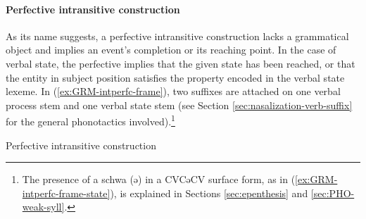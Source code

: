\begin{exe}
\begin{exe}
\begin{exe}
\begin{exe}
\begin{exe}
\begin{exe}
\begin{exe}
\begin{exe}
\begin{exe}
\begin{exe}
\begin{exe}
 
%  
% 
% 
% 
% 
% 

\paragraph{Perfective intransitive construction}
\label{sec:GRM-verb-perf-intran}

As its name suggests, a  perfective 
intransitive construction  lacks a 
grammatical
object and implies an event's completion or its 
reaching point.  In the case of verbal state,
the  perfective  implies that the given state has been reached, 
or 
that the entity in subject position   satisfies the property encoded in
the verbal state lexeme. In 
(\ref{ex:GRM-intperfc-frame}),  two suffixes 
are
attached on  one verbal process stem and one  verbal state 
stem (see Section \ref{sec:nasalization-verb-suffix}
for the general phonotactics involved).\footnote{The presence of  a schwa
({\sls ə}) in a CVCəCV surface form, as in (\ref{ex:GRM-intperfc-frame-state}), 
is explained in Sections \ref{sec:epenthesis} and \ref{sec:PHO-weak-syll}.}


\ea\label{ex:GRM-intperfc-frame}{\rm Perfective intransitive construction}\\



\end{exe}
\end{exe}
\end{exe}
\end{exe}
\end{exe}
\end{exe}
\end{exe}
\end{exe}
\end{exe}
\end{exe}
\end{exe}
